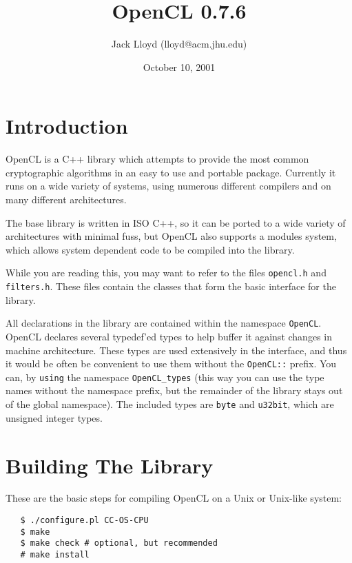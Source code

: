 \documentclass{article}
\title{OpenCL 0.7.6}
\author{Jack Lloyd (lloyd@acm.jhu.edu)}
\date{October 10, 2001}
\newcommand{\filename}[1]{\texttt{#1}}
\newcommand{\type}[1]{\texttt{#1}}
\begin{document}
\maketitle

\parskip=3pt
\tableofcontents

\parskip=5pt
\pagebreak

\section{Introduction}

OpenCL is a C++ library which attempts to provide the most common cryptographic
algorithms in an easy to use and portable package.  Currently it runs on a wide
variety of systems, using numerous different compilers and on many different
architectures.

The base library is written in ISO C++, so it can be ported to a wide variety
of architectures with minimal fuss, but OpenCL also supports a modules system,
which allows system dependent code to be compiled into the library.

While you are reading this, you may want to refer to the files
\filename{opencl.h} and \filename{filters.h}. These files contain the classes
that form the basic interface for the library.

All declarations in the library are contained within the namespace
\texttt{OpenCL}.  OpenCL declares several typedef'ed types to help buffer it
against changes in machine architecture. These types are used extensively in
the interface, and thus it would be often be convenient to use them without the
\texttt{OpenCL::} prefix.  You can, by \texttt{using} the namespace
\texttt{OpenCL\_types} (this way you can use the type names without the
namespace prefix, but the remainder of the library stays out of the global
namespace). The included types are \type{byte} and \type{u32bit}, which are
unsigned integer types.

\pagebreak

\section{Building The Library}

These are the basic steps for compiling OpenCL on a Unix or Unix-like system:

\begin{verbatim}
   $ ./configure.pl CC-OS-CPU
   $ make
   $ make check # optional, but recommended
   # make install
\end{verbatim}
\end{document}
